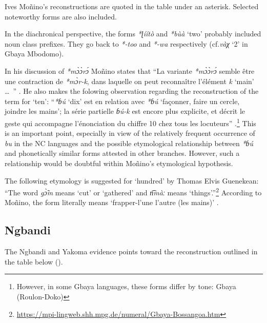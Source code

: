 Ives Moñino’s reconstructions \citep{Moñino1995} are quoted in the table under an asterisk. Selected noteworthy forms are also included.

In the diachronical perspective, the forms \textit{*ɭíítò} and \textit{*b{\`{u}}à} ‘two’ probably included noun class prefixes. They go back to \textit{*-too} and \textit{*-wa} respectively (cf.\textit{vàχ} ‘2’ in Gbaya Mbodomo).

In his discussion of \textit{*m{\`{ɔ}}{\`{ɔ}}r{\'{ɔ}}} Moñino states that “La variante \textit{*m{\`{ɔ}}{\`{ɔ}}r{\'{ɔ}}} semble être une contraction de \textit{*m{\`{ɔ}}r-k{}}, dans laquelle on peut reconnaître l’élément \textit{k{}} ‘main’ …~” \citep[655]{Moñino1995}. He also makes the folowing observation regarding the reconstruction of the term for ‘ten’: “\textit{*ɓú} ‘dix’ est en relation avec \textit{*ɓú} ‘façonner, faire un cercle, joindre les mains’; la série partielle \textit{ɓú-k{}} est encore plus explicite, et décrit le geste qui accompagne l’énonciation du chiffre 10 chez tous les locuteurs” \citep[656]{Moñino1995}.\footnote{However, in some Gbaya languages, these forms differ by tone: Gbaya (Roulon-Doko)  } This is an important point, especially in view of the relatively frequent occurrence of \textit{bu} in the NC languages and the possible etymological relationship between \textit{*ɓú} and phonetically similar forms attested in other branches. However, such a relationship would be doubtful within Moñino’s etymological hypothesis. 

The following etymology is suggested for ‘hundred’ by Thomas Elvis Guenekean: “The word \textit{g{\`{\~ɔ}}m} means ‘cut’ or ‘gathered’ and \textit{n͡màː} means ‘things’.”\footnote{\url{https://mpi-lingweb.shh.mpg.de/numeral/Gbaya-Bossangoa.htm}} According to Moñino, the form literally means ‘frapper-l’une l’autre (les mains)’ \citep[657]{Moñino1995}.


\subsection{Ngbandi}%
The Ngbandi and Yakoma evidence points toward the reconstruction outlined in the table below ().

